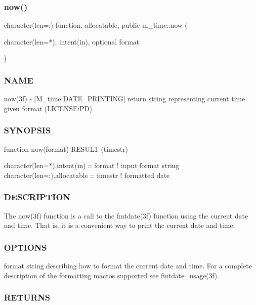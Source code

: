 \subsubsection{\texorpdfstring{now()}{now()}}
{\footnotesize\ttfamily character(len=\+:) function, allocatable, public m\+\_\+time\+::now (\begin{DoxyParamCaption}\item[{character(len=$\ast$), intent(in), optional}]{format }\end{DoxyParamCaption})}



\subsubsection*{N\+A\+ME}

now(3f) -\/ \mbox{[}M\+\_\+time\+:D\+A\+T\+E\+\_\+\+P\+R\+I\+N\+T\+I\+NG\mbox{]} return string representing current time given format (L\+I\+C\+E\+N\+SE\+:PD) 

\subsubsection*{S\+Y\+N\+O\+P\+S\+IS}

\begin{DoxyVerb}function now(format) RESULT (timestr)

 character(len=*),intent(in)     :: format  ! input format string
 character(len=:),allocatable    :: timestr ! formatted date
\end{DoxyVerb}


\subsubsection*{D\+E\+S\+C\+R\+I\+P\+T\+I\+ON}

The now(3f) function is a call to the fmtdate(3f) function using the current date and time. That is, it is a convenient way to print the current date and time.

\subsubsection*{O\+P\+T\+I\+O\+NS}

format string describing how to format the current date and time. For a complete description of the formatting macros supported see fmtdate\+\_\+usage(3f). \subsubsection*{R\+E\+T\+U\+R\+NS}

